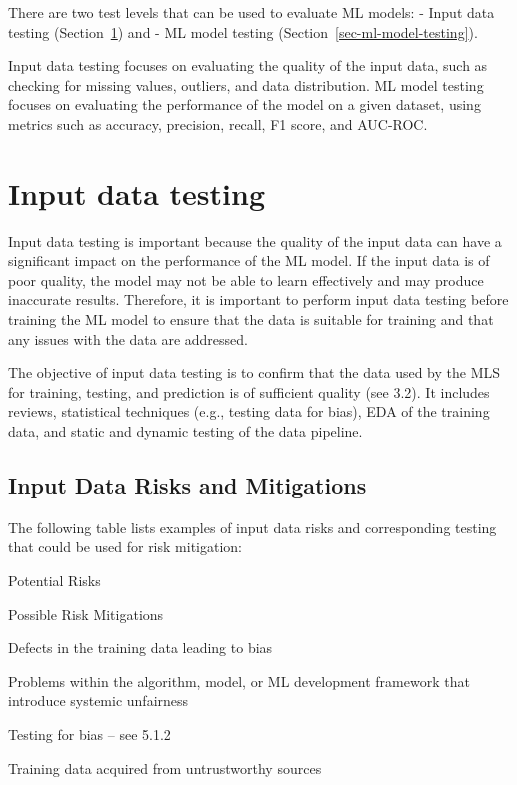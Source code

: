 \documentclass[
  letterpaper,
  DIV=11,
  numbers=noendperiod,
  oneside]{scrreprt}
\begin{document}
\begin{tcolorbox}
There are two test levels that can be used to evaluate ML models: -
Input data testing (Section~\ref{sec-input-data-testing}) and - ML model
testing (Section~\ref{sec-ml-model-testing}).

Input data testing focuses on evaluating the quality of the input data,
such as checking for missing values, outliers, and data distribution. ML
model testing focuses on evaluating the performance of the model on a
given dataset, using metrics such as accuracy, precision, recall, F1
score, and AUC-ROC.

\section{Input data testing}\label{sec-input-data-testing}

Input data testing is important because the quality of the input data
can have a significant impact on the performance of the ML model. If the
input data is of poor quality, the model may not be able to learn
effectively and may produce inaccurate results. Therefore, it is
important to perform input data testing before training the ML model to
ensure that the data is suitable for training and that any issues with
the data are addressed.

The objective of input data testing{} is to confirm that the data used
by the MLS for training, testing, and prediction is of sufficient
quality (see 3.2). It includes reviews, statistical techniques (e.g.,
testing data for bias), EDA of the training data, and static and dynamic
testing{} of the data pipeline.

\subsection{Input Data Risks and
Mitigations}\label{input-data-risks-and-mitigations}

The following table lists examples of input data risks and corresponding
testing that could be used for risk mitigation:

Potential Risks

Possible Risk Mitigations

Defects in the training data leading to bias

Problems within the algorithm, model, or ML development framework that
introduce systemic unfairness

Testing for bias -- see 5.1.2

Training data acquired from untrustworthy sources


\end{tcolorbox}
\end{document}
